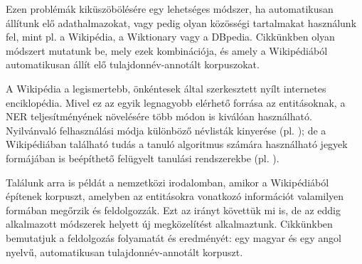 \documentclass{llncs}
\begin{document}
Ezen problémák kiküszöbölésére egy lehetséges módszer, ha automatikusan állítunk elő  
adathalmazokat, vagy pedig olyan közösségi tartalmakat használunk fel, mint pl. a
Wikipédia, a Wiktionary vagy a DBpedia. Cikkünkben olyan módszert mutatunk be, mely ezek
kombinációja, és amely a Wikipédiából automatikusan állít elő tulajdonnév-annotált
korpuszokat.




A Wikipédia a legismertebb, önkéntesek által szerkesztett nyílt internetes
enciklopédia. Mivel ez az egyik
legnagyobb elérhető forrása az entitásoknak, a NER teljesítményének növelésére több
módon is kiválóan használható. Nyilvánvaló felhasználási
módja különböző névlisták kinyerése (pl. \cite{Toral_2006.a}); de a Wikipédiában található
tudás a tanuló algoritmus számára használható jegyek formájában is beépíthető felügyelt
tanulási rendszerekbe (pl. \cite{KaTo07}). 

Találunk arra is példát a nemzetközi irodalomban, amikor a Wikipédiából építenek
korpuszt, amelyben az entitásokra vonatkozó információt valamilyen formában megőrzik és
feldolgozzák. Ezt az irányt követtük mi is, de az eddig alkalmazott módszerek
helyett új megközelítést alkalmaztunk. Cikkünkben bemutatjuk a feldolgozás
folyamatát és eredményét: egy magyar és egy angol nyelvű, automatikusan
tulajdonnév-annotált korpuszt.
\end{document}
